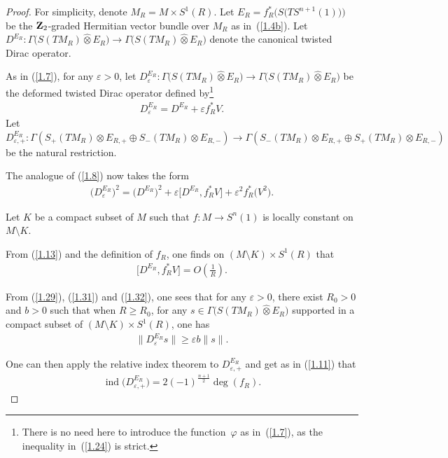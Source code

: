 \documentclass[pdftex]{sigma}
\numberwithin{equation}{section}
\theoremstyle{definition}
\begin{document}
\begin{proof}
For simplicity, denote $M_R=M\times S^1(R)$. Let $E_R =f_R^*\big(S\big(TS^{n+1}(1)\big)\big)$ be the ${\bf Z}_2$-graded Hermitian vector bundle over $M_R$ as in~(\ref{1.4b}).
Let $D^{E_R}\colon \Gamma\big(S(TM_R)\widehat\otimes E_R\big)\rightarrow
\Gamma\big(S(TM_R)\widehat\otimes E_R\big)$ denote the canonical twisted Dirac operator.

As in (\ref{1.7}), for any $\varepsilon>0$,
let $D^{E_R}_\varepsilon\colon \Gamma\big(S(TM_R)\widehat\otimes E_R\big)\rightarrow
\Gamma\big(S(TM_R)\widehat\otimes E_R\big)$ be the deformed twisted Dirac operator defined by\footnote{There is no need here to introduce the function~$\varphi$ as in~(\ref{1.7}), as the inequality in~(\ref{1.24}) is strict.}
\begin{gather*}%
D^{E_R}_\varepsilon =D^{E_R}+\varepsilon f_R^*V.
\end{gather*}
Let $D^{E_R}_{\varepsilon,+}\colon \Gamma (S_+(TM_R) \otimes E_{R,+}\oplus S_-(TM_R)\otimes E_{R,-} ) \rightarrow \Gamma(S_-(TM_R) \otimes E_{R,+}\oplus S_+(TM_R)\otimes E_{R,-}) $ be the natural restriction.

The analogue of (\ref{1.8}) now takes the form
\begin{gather}\label{1.31}
\big(D^{E_R}_\varepsilon\big)^2 =\big(D^{E_R}\big)^2
+\varepsilon \big[D^{E_R},f_R^*V\big]+\varepsilon^2 f_R^*\big(V^2\big).
\end{gather}

Let $K$ be a compact subset of $M$ such that $f\colon M\rightarrow S^n(1)$ is locally constant on $M\setminus K$.

From (\ref{1.13}) and the definition of $f_R$, one finds on $ (M\setminus K)\times S^1(R)$ that
\begin{gather}\label{1.32}
\big[D^{E_R},f_R^*V\big] = O\left(\frac{1}{R}\right).
\end{gather}

From (\ref{1.29}), (\ref{1.31}) and (\ref{1.32}), one sees that for any $\varepsilon>0$, there exist $R_0>0$ and \mbox{$b>0$} such that when $R\geq R_0$, for any $s\in \Gamma\big(S(TM_R)\widehat\otimes E_R\big)$ supported in a compact subset of $ (M\setminus K)\times S^1(R)$, one has
\begin{gather}\label{1.33}
\big\|D^{E_R}_\varepsilon s\big\| \geq \varepsilon b \|s\|.
\end{gather}

One can then apply the relative index theorem \cite{GL83} to $D^{E_R}_{\varepsilon,+}$ and get as in (\ref{1.11}) that
\begin{gather}\label{1.34}
\operatorname{ind}\big(D^{E_R}_{\varepsilon,+}\big) = 2(-1)^{\frac{n+1}{2}}\deg (f_R ) .
\end{gather}


\end{proof}
\end{document}
